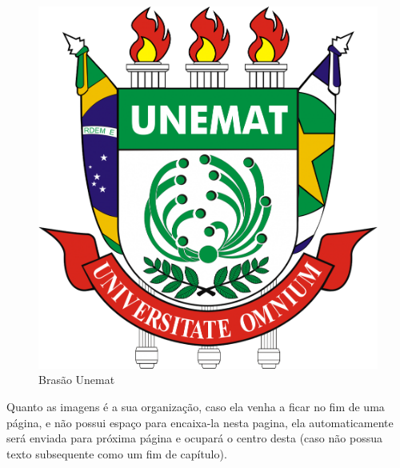 \begin{figure}[htb]			
	\caption{Brasão Unemat \label{fig_Cap2_brasaoUnemat}}
	\begin{center}
		\includegraphics[scale=0.1]{./Imagens/Brasao_Unemat.png}
	\end{center}
\end{figure}

 \begin{observacao}
 	Quanto as imagens é a sua organização, caso ela venha a ficar no fim de uma página, e não possui espaço para encaixa-la nesta pagina, ela automaticamente será enviada para  próxima página e ocupará o centro desta (caso não possua texto subsequente como um fim de capítulo).
\end{observacao}